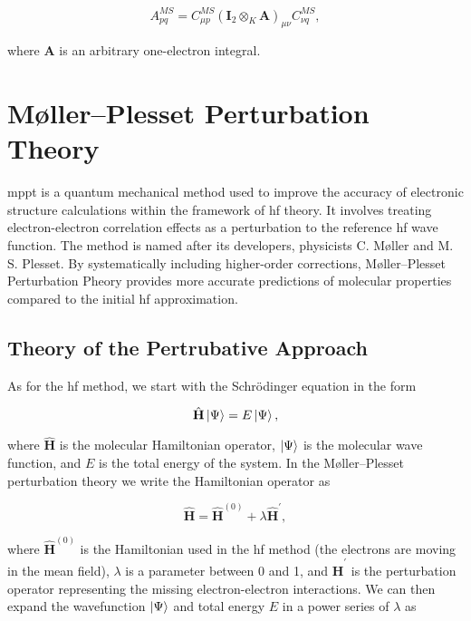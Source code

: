 \documentclass[open=any,parskip=half,11pt]{scrbook}
\begin{document}
\begin{equation}
A_{pq}^{MS}=C_{\mu p}^{MS}(\mathbf{I}_{2}\otimes_K\mathbf{A})_{\mu\nu}C_{\nu q}^{MS},
\end{equation}

where \(\mathbf{A}\) is an arbitrary one-electron integral.
\chapter{Møller--Plesset Perturbation Theory}\label{muxf8llerplesset-perturbation-theory}

\acrfull{mppt} is a quantum mechanical method used to improve the accuracy of electronic structure calculations within the framework of \acrshort{hf} theory. It involves treating electron-electron correlation effects as a perturbation to the reference \acrshort{hf} wave function. The method is named after its developers, physicists C. Møller and M. S. Plesset. By systematically including higher-order corrections, Møller--Plesset Perturbation Pheory provides more accurate predictions of molecular properties compared to the initial \acrshort{hf} approximation.

\section{Theory of the Pertrubative Approach}\label{theory-of-the-pertrubative-approach}

As for the \acrshort{hf} method, we start with the Schrödinger equation in the form

\begin{equation}
\hat{\mathbf{H}}\ket{\Psi}=E\ket{\Psi},
\end{equation}

where \(\hat{\mathbf{H}}\) is the molecular Hamiltonian operator, \(\ket{\Psi}\) is the molecular wave function, and \(E\) is the total energy of the system. In the Møller--Plesset perturbation theory we write the Hamiltonian operator as

\begin{equation}
\hat{\mathbf{H}}=\hat{\mathbf{H}}^{(0)}+\lambda\hat{\mathbf{H}}^{'},
\end{equation}

where \(\hat{\mathbf{H}}^{(0)}\) is the Hamiltonian used in the \acrshort{hf} method (the electrons are moving in the mean field), \(\lambda\) is a parameter between 0 and 1, and \(\hat{\mathbf{H}}^{'}\) is the perturbation operator representing the missing electron-electron interactions. We can then expand the wavefunction \(\ket{\Psi}\) and total energy \(E\) in a power series of \(\lambda\) as
\end{document}
